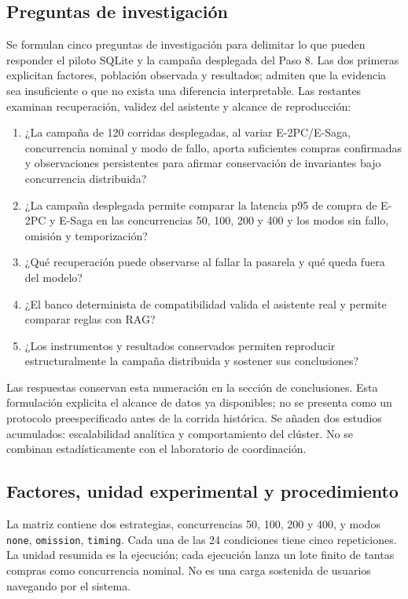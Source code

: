 \documentclass[12pt,a4paper]{article}
\begin{document}
\subsection{Preguntas de investigación}\label{sec:preguntas-investigacion}
Se formulan cinco preguntas de investigación para delimitar lo que pueden responder el piloto SQLite y la campaña desplegada del Paso 8. Las dos primeras explicitan factores, población observada y resultados; admiten que la evidencia sea insuficiente o que no exista una diferencia interpretable. Las restantes examinan recuperación, validez del asistente y alcance de reproducción:
\begin{enumerate}
\item ¿La campaña de 120 corridas desplegadas, al variar E-2PC/E-Saga, concurrencia nominal y modo de fallo, aporta suficientes compras confirmadas y observaciones persistentes para afirmar conservación de invariantes bajo concurrencia distribuida?
\item ¿La campaña desplegada permite comparar la latencia p95 de compra de E-2PC y E-Saga en las concurrencias 50, 100, 200 y 400 y los modos sin fallo, omisión y temporización?
\item ¿Qué recuperación puede observarse al fallar la pasarela y qué queda fuera del modelo?
\item ¿El banco determinista de compatibilidad valida el asistente real y permite comparar reglas con RAG?
\item ¿Los instrumentos y resultados conservados permiten reproducir estructuralmente la campaña distribuida y sostener sus conclusiones?
\end{enumerate}
Las respuestas conservan esta numeración en la sección de conclusiones. Esta formulación explicita el alcance de datos ya disponibles; no se presenta como un protocolo preespecificado antes de la corrida histórica. Se añaden dos estudios acumulados: escalabilidad analítica y comportamiento del clúster. No se combinan estadísticamente con el laboratorio de coordinación.

\subsection{Factores, unidad experimental y procedimiento}
La matriz contiene dos estrategias, concurrencias 50, 100, 200 y 400, y modos \texttt{none}, \texttt{omission}, \texttt{timing}. Cada una de las 24 condiciones tiene cinco repeticiones. La unidad resumida es la ejecución; cada ejecución lanza un lote finito de tantas compras como concurrencia nominal. No es una carga sostenida de usuarios navegando por el sistema.
\end{document}
